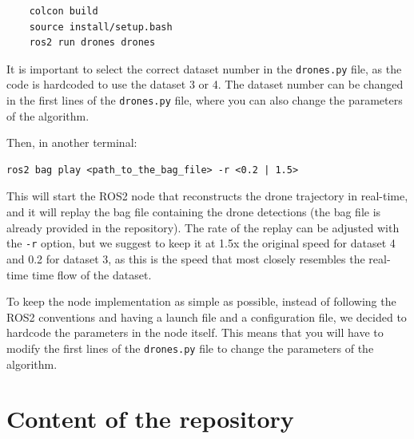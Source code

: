 \documentclass[11pt]{article}
\begin{document}
\begin{verbatim}
    colcon build
    source install/setup.bash
    ros2 run drones drones
\end{verbatim}

It is important to select the correct dataset number in the \texttt{drones.py} file, as the code is hardcoded to use the dataset 3 or 4. The dataset number can be changed in the first lines of the \texttt{drones.py} file, where you can also change the parameters of the algorithm.

Then, in another terminal:

\begin{verbatim}
ros2 bag play <path_to_the_bag_file> -r <0.2 | 1.5>
\end{verbatim}

This will start the ROS2 node that reconstructs the drone trajectory in real-time, and it will replay the bag file containing the drone detections (the bag file is already provided in the repository). The rate of the replay can be adjusted with the \texttt{-r} option, but we suggest to keep it at 1.5x the original speed for dataset 4 and 0.2 for dataset 3, as this is the speed that most closely resembles the real-time time flow of the dataset.

To keep the node implementation as simple as possible, instead of following the ROS2 conventions and having a launch file and a configuration file, we decided to hardcode the parameters in the node itself. This means that you will have to modify the first lines of the \texttt{drones.py} file to change the parameters of the algorithm.

\section{Content of the repository}
\end{document}

